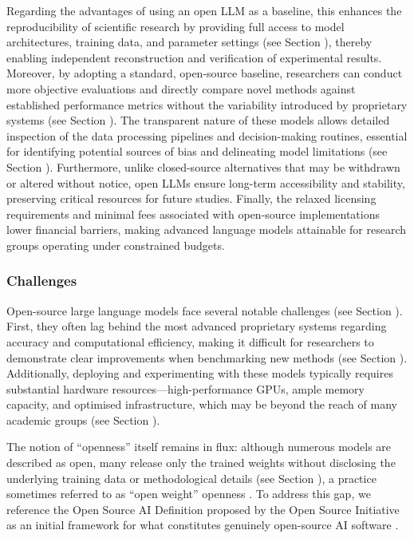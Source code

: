 Regarding the advantages of using an open LLM as a baseline, this enhances the reproducibility of scientific research by providing full access to model architectures, training data, and parameter settings (see Section \modelversion), thereby enabling independent reconstruction and verification of experimental results. Moreover, by adopting a standard, open-source baseline, researchers can conduct more objective evaluations and directly compare novel methods against established performance metrics without the variability introduced by proprietary systems (see Section \benchmarksmetrics). The transparent nature of these models allows detailed inspection of the data processing pipelines and decision-making routines, essential for identifying potential sources of bias and delineating model limitations (see Section \limitationsmitigations). Furthermore, unlike closed-source alternatives that may be withdrawn or altered without notice, open LLMs ensure long-term accessibility and stability, preserving critical resources for future studies. Finally, the relaxed licensing requirements and minimal fees associated with open-source implementations lower financial barriers, making advanced language models attainable for research groups operating under constrained budgets.


\subsubsection{Challenges}

Open-source large language models face several notable challenges (see Section \limitationsmitigations). First, they often lag behind the most advanced proprietary systems regarding accuracy and computational efficiency, making it difficult for researchers to demonstrate clear improvements when benchmarking new methods (see Section \benchmarksmetrics). Additionally, deploying and experimenting with these models typically requires substantial hardware resources---high-performance GPUs, ample memory capacity, and optimised infrastructure, which may be beyond the reach of many academic groups (see Section \toolarchitecture). 

The notion of “openness” itself remains in flux: although numerous models are described as open, many release only the trained weights without disclosing the underlying training data or methodological details (see Section \modelversion), a practice sometimes referred to as ``open weight'' openness \cite{Gibney2024}. To address this gap, we reference the Open Source AI Definition proposed by the Open Source Initiative as an initial framework for what constitutes genuinely open-source AI software \cite{OSIAI2024}. 

